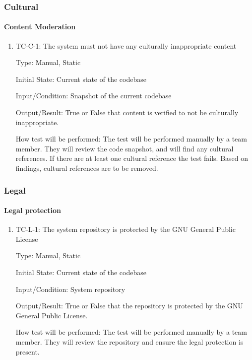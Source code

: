 \documentclass[12pt, titlepage]{article}
\begin{document}
\subsubsection{Cultural}

\paragraph{Content Moderation}
\begin{enumerate}
\item{TC-C-1: The system must not have any culturally inappropriate content}

Type: Manual, Static
					
Initial State: Current state of the codebase
					
Input/Condition: Snapshot of the current codebase 
					
Output/Result: True or False that content is verified to not be culturally inappropriate.
					
How test will be performed: The test will be performed manually by a team member. They will review the code snapshot, and will find any cultural references. If there are at least one cultural reference the test fails. Based on findings, cultural references are to be removed.
\end{enumerate}

\subsubsection{Legal}

\paragraph{Legal protection}
\begin{enumerate}
\item{TC-L-1: The system repository is protected by the GNU General Public License}

Type: Manual, Static
					
Initial State: Current state of the codebase
					
Input/Condition: System repository
					
Output/Result: True or False that the repository is protected by the GNU General Public License.
					
How test will be performed: The test will be performed manually by a team member. They will review the repository and ensure the legal protection is present.
\end{enumerate}
\end{document}
